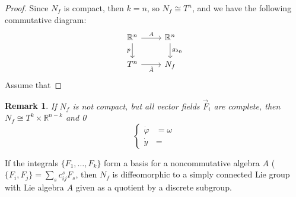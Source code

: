 \documentclass{article}
\newcommand{\R}{\mathbb R}
\newcommand{\nl}{\newline\newline\noindent}
\newcommand{\vhi}{\varphi}
\newcommand{\w}{\omega}
\newtheorem{rk}{Remark}
\begin{document}
\begin{proof}
    \nl
    Since $N_f$ is compact, then $k=n$, so $N_f\cong T^n$, and we have the following commutative diagram:
    \[\begin{tikzcd}
    	{\R^n} & {\R^n} \\
    	{T^n} & {N_f}
    	\arrow["A", from=1-1, to=1-2]
    	\arrow["p"', from=1-1, to=2-1]
    	\arrow["{\tilde A}"', from=2-1, to=2-2]
    	\arrow["{g_{\lambda_0}}", from=1-2, to=2-2]
    \end{tikzcd}\]
    Assume that 
\end{proof}
\begin{rk}
    If $N_f$ is not compact, but all vector fields $\vec F_i$ are complete, then $N_f \cong T^k\times \R^{n-k}$ and 0
    \[\left\{\begin{aligned}
            \dot \vhi &= \w\\
            \dot y &= 
        \end{aligned}\right.\]
\end{rk}
If the integrals $\{F_1,\dots, F_k\}$ form a basis for a noncommutative algebra $A$ ($\{F_i,F_j\} = \sum_s c_{ij}^sF_s$, then $N_f$ is diffeomorphic to a simply connected Lie group with Lie algebra $A$ given as a quotient by a discrete subgroup.
\end{document}
